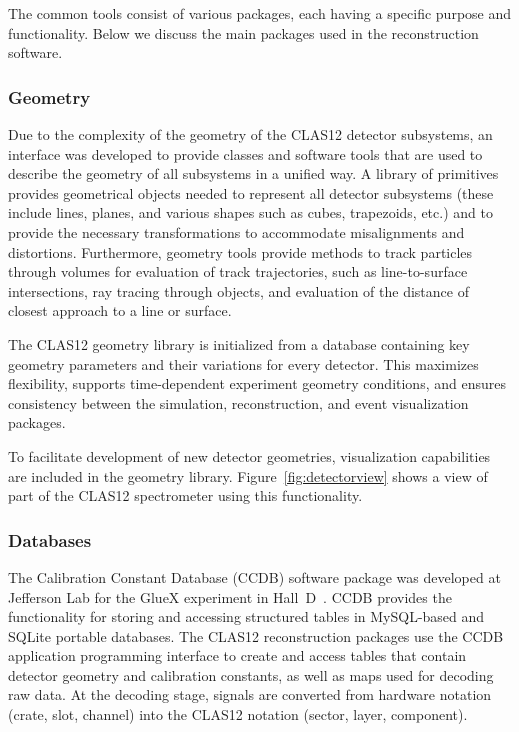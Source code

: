 The common tools consist of various packages, each having a specific purpose and functionality. Below we discuss
the main packages used in the reconstruction software.

\subsubsection{Geometry}

Due to the complexity of the geometry of the CLAS12 detector subsystems, an interface was developed to provide
classes and software tools that are used to describe the geometry of all subsystems in a unified way.  A library of
primitives provides geometrical objects needed to represent all detector subsystems (these include lines, planes,
and various shapes such as cubes, trapezoids, etc.) and to provide the necessary transformations to accommodate
misalignments and distortions.  Furthermore, geometry tools provide methods to track particles through volumes for
evaluation of track trajectories, such as line-to-surface intersections, ray tracing through objects, and evaluation of
the distance of closest approach to a line or surface.

The CLAS12 geometry library is initialized from a database containing key geometry parameters and their
variations for every detector.  This maximizes flexibility, supports time-dependent experiment geometry
conditions, and ensures consistency between the simulation, reconstruction, and event visualization packages.

To facilitate development of new detector geometries, visualization capabilities are included in the geometry library.
Figure~\ref{fig:detectorview} shows a view of part of the CLAS12 spectrometer using this functionality.

\subsubsection{Databases}

The Calibration Constant Database (CCDB) software package was developed at Jefferson Lab for the GlueX
experiment in Hall~D~\cite{gluex}.  CCDB provides the functionality for storing and accessing structured tables in
MySQL-based and SQLite portable databases. The CLAS12 reconstruction packages use the CCDB application
programming interface to create and access tables that contain detector geometry and calibration constants, as
well as maps used for decoding raw data. At the decoding stage, signals are converted from hardware notation
(crate, slot, channel) into the CLAS12 notation (sector, layer, component). 

